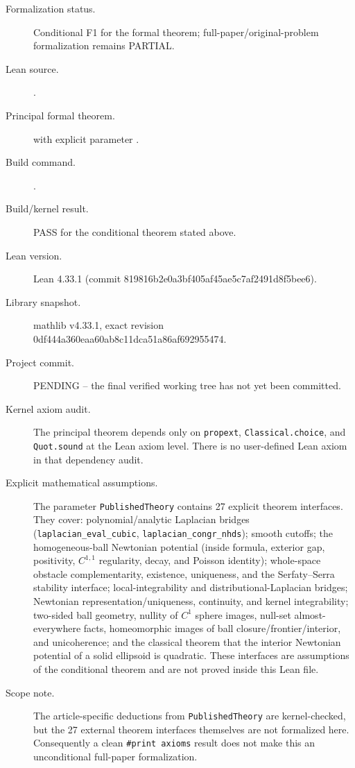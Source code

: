 \documentclass[11pt]{article}
\theoremstyle{definition}
\theoremstyle{remark}
\newcommand{\1}{\mathbf{1}}
\begin{document}
\begin{description}
\item[Formalization status.] Conditional F1 for the formal theorem; full-paper/original-problem formalization remains PARTIAL.
\item[Lean source.] \texttt{}.
\item[Principal formal theorem.] \texttt{} with explicit parameter \texttt{}.
\item[Build command.] \texttt{}.
\item[Build/kernel result.] PASS for the conditional theorem stated above.
\item[Lean version.] Lean 4.33.1 (commit 819816b2e0a3bf405af45ae5c7af2491d8f5bee6).
\item[Library snapshot.] mathlib v4.33.1, exact revision 0df444a360eaa60ab8c11dca51a86af692955474.
\item[Project commit.] PENDING -- the final verified working tree has not yet been committed.
\item[Kernel axiom audit.] The principal theorem depends only on \texttt{propext}, \texttt{Classical.choice}, and \texttt{Quot.sound} at the Lean axiom level. There is no user-defined Lean axiom in that dependency audit.
\item[Explicit mathematical assumptions.] The parameter \texttt{PublishedTheory} contains 27 explicit theorem interfaces. They cover: polynomial/analytic Laplacian bridges (\texttt{laplacian\_eval\_cubic}, \texttt{laplacian\_congr\_nhds}); smooth cutoffs; the homogeneous-ball Newtonian potential (inside formula, exterior gap, positivity, $C^{1,1}$ regularity, decay, and Poisson identity); whole-space obstacle complementarity, existence, uniqueness, and the Serfaty--Serra stability interface; local-integrability and distributional-Laplacian bridges; Newtonian representation/uniqueness, continuity, and kernel integrability; two-sided ball geometry, nullity of $C^1$ sphere images, null-set almost-everywhere facts, homeomorphic images of ball closure/frontier/interior, and unicoherence; and the classical theorem that the interior Newtonian potential of a solid ellipsoid is quadratic. These interfaces are assumptions of the conditional theorem and are not proved inside this Lean file.
\item[Scope note.] The article-specific deductions from \texttt{PublishedTheory} are kernel-checked, but the 27 external theorem interfaces themselves are not formalized here. Consequently a clean \texttt{\#print axioms} result does not make this an unconditional full-paper formalization.
\end{description}
\end{document}
